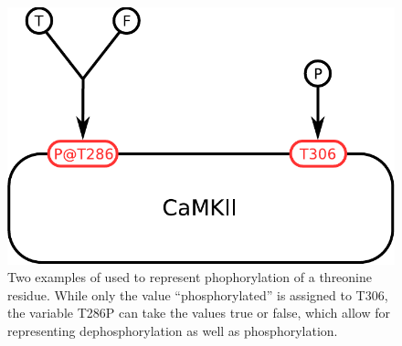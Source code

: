 \begin{figure}[H]
  \centering
  \includegraphics[scale = 0.5]{examples/ex-stateVariable}
  \caption{Two examples of  used to represent phophorylation of a threonine residue. While only the value ``phosphorylated'' is assigned to T306, the variable T286P can take the values true or false, which allow for representing dephosphorylation as well as phosphorylation.}
  \label{fig:ex-state-Variable}
\end{figure}

